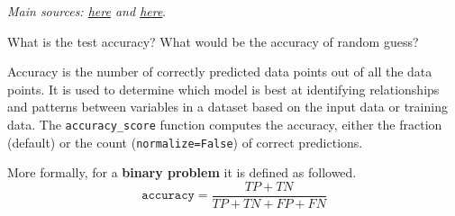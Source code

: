 \documentclass[10pt,a4paper]{article}
\theoremstyle{break}
\begin{document}
\emph{Main sources: \href{https://medium.com/@paritoshkumar_5426/time-complexity-of-ml-models-4ec39fad2770}{here} and \href{https://www.thekerneltrip.com/machine/learning/computational-complexity-learning-algorithms/}{here}}.

\begin{tcolorbox}

What is the test accuracy? What would be the accuracy of random guess?

\end{tcolorbox}

Accuracy is the number of correctly predicted data points out of all the data points. It is used to determine which model is best at identifying relationships and patterns between variables in a dataset based on the input data or training data. The \texttt{accuracy\_score} function computes the accuracy, either the fraction (default) or the count (\texttt{normalize=False}) of correct predictions.

More formally, for a \textbf{binary problem} it is defined as followed.
\[
\texttt{accuracy} = \frac{TP + TN}{TP + TN + FP + FN}
\]
\end{document}
